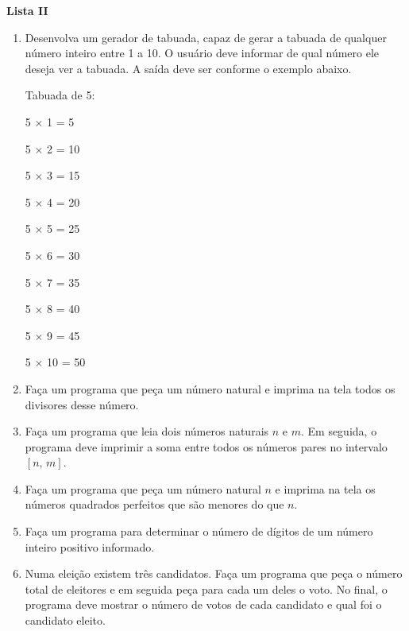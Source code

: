 \documentclass[12pt,a4paper]{article}
\begin{document}
\begin{center}
  \textbf{Lista II}
\end{center}

\begin{enumerate}
  \item Desenvolva um gerador de tabuada, capaz de gerar a tabuada de qualquer número inteiro
  entre 1 a 10. O usuário deve informar de qual número ele deseja ver a tabuada. A saída deve
  ser conforme o exemplo abaixo.

    \vspace{0.5cm}
    Tabuada de 5:
    
    5 $\times$ 1 = 5
    
    5 $\times$ 2 = 10
    
    5 $\times$ 3 = 15
    
    5 $\times$ 4 = 20
    
    5 $\times$ 5 = 25
    
    5 $\times$ 6 = 30
    
    5 $\times$ 7 = 35

    5 $\times$ 8 = 40
    
    5 $\times$ 9 = 45
    
    5 $\times$ 10 = 50

    \vspace{0.5cm}

  \item Faça um programa que peça um número natural e imprima na tela todos os 
  divisores desse número.

  \item Faça um programa que leia dois números naturais $n$ e $m$. Em seguida, o
  programa deve imprimir a soma entre todos os números pares no intervalo $[n,\, m]$.
     
  \item Faça um programa que peça um número natural $n$ e imprima na tela os números 
  quadrados perfeitos que são menores do que $n$.
 
   \item Faça um programa para determinar o número de dígitos de um número
   inteiro positivo informado.

  \item Numa eleição existem três candidatos. Faça um programa que peça o número total de eleitores
  e em seguida peça para cada um deles o voto. No final, o programa deve mostrar o número de votos
  de cada candidato e qual foi o candidato eleito.  
\end{enumerate}
\end{document}
